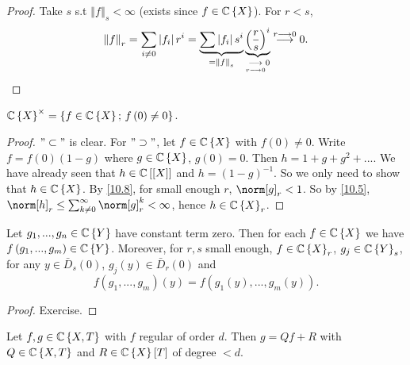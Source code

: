 \begin{proof}
Take $s$ s.t $\left\Vert f\right\Vert _{s}<\infty$ (exists since
$f\in\mathbb{C}\left\{ X\right\} $). For $r<s$, 
\[
\left\Vert f\right\Vert _{r}=\sum_{i\neq0}\left|f_{i}\right|r^{i}=\underbrace{\sum\left|f_{i}\right|s^{i}}_{=\left\Vert f\right\Vert _{s}}\underbrace{\left(\frac{r}{s}\right)^{i}}_{\underset{r\longrightarrow0}{\longrightarrow}0}\overset{r\longrightarrow0}{\longrightarrow}0.
\]
\end{proof}
\begin{cor*}
\label{10.9} $\mathbb{C}\left\{ X\right\} ^{\times}=\left\{ f\in\mathbb{C}\left\{ X\right\} ;\, f\left(0\right)\neq0\right\} $.\end{cor*}
\begin{proof}
$"\subset"$ is clear. For $"\supset"$, let $f\in\mathbb{C}\left\{ X\right\} $
with $f\left(0\right)\neq0$. Write $f=f\left(0\right)\left(1-g\right)$
where $g\in\mathbb{C}\left\{ X\right\} $, $g\left(0\right)=0$. Then $h=1+g+g^{2}+...$.
We have already seen that $h\in\mathbb{C}\left[\left[X\right]\right]$ and
$h=\left(1-g\right)^{-1}$. So we only need to show that $h\in\mathbb{C}\left\{ X\right\} $.
By \eqref{10.8}, for small enough $r$, $\norm[g]_{r}<1$. So by \eqref{10.5},
$\norm[h]_{r}\leq\sum_{k\neq0}^{\infty}\norm[g]_{r}^{k}<\infty$,
hence $h\in\mathbb{C}\left\{ X\right\} _{r}$.\end{proof}
\begin{lem*}
\label{10.10} Let $g_{1},...,g_{n}\in\mathbb{C}\left\{ Y\right\} $ have constant
term zero. Then for each $f\in\mathbb{C}\left\{ X\right\} $ we have $f\left(g_{1},...,g_{m}\right)\in\mathbb{C}\left\{ Y\right\} $.
Moreover, for $r,s$ small enough, $f\in\mathbb{C}\left\{ X\right\} _{r}$,
$g_{j}\in\mathbb{C}\left\{ Y\right\} _{s}$, for any $y\in\bar{D}_{s}\left(0\right)$,
$g_{j}\left(y\right)\in\bar{D}_{r}\left(0\right)$ and
\[
f\left(g_{1},...,g_{m}\right)\left(y\right)=f\left(g_{1}\left(y\right),...,g_{m}\left(y\right)\right).
\]
\end{lem*}
\begin{proof}
Exercise.\end{proof}
\begin{thm*}
\label{10.11} Let $f,g\in\mathbb{C}\left\{ X,T\right\} $ with $f$ regular of order
$d$. Then $g=Qf+R$ with $Q\in\mathbb{C}\left\{ X,T\right\} $ and $R\in\mathbb{C}\left\{ X\right\} \left[T\right]$
of degree $<d$.\end{thm*}

